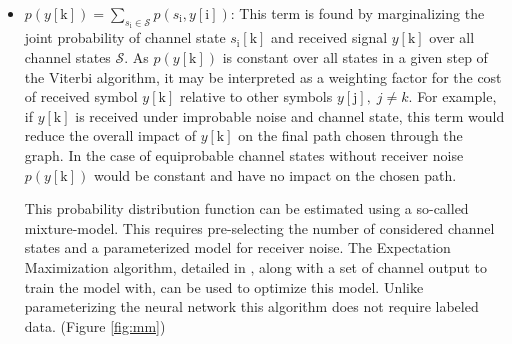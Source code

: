 \documentclass[12pt,a4paper]{report}
\begin{document}
\begin{itemize}
\item $p(y[\mathrm{k}]) = \sum_{s_{\mathrm{i}} \in \textit{$\mathcal{S}$}}p(s_{\mathrm{i}},y[\mathrm{i}])$: This term is found by marginalizing the joint probability of channel state $s_{\mathrm{i}}[\mathrm{k}]$ and received signal $y[\mathrm{k}]$ over all channel states $\mathcal{S}$. As $p(y[\mathrm{k}])$ is constant over all states in a given step of the Viterbi algorithm, it may be interpreted as a weighting factor for the cost of received symbol $y[\mathrm{k}]$ relative to other symbols $y[\mathrm{j}], \; j\neq k$. For example, if $y[\mathrm{k}]$ is received under improbable noise and channel state, this term would reduce the overall impact of $y[\mathrm{k}]$ on the final path chosen through the graph. In the case of equiprobable channel states without receiver noise $p(y[\mathrm{k}])$ would be constant and have no impact on the chosen path.
\par
This probability distribution function can be estimated using a so-called mixture-model. This requires pre-selecting the number of considered channel states and a parameterized model for receiver noise. The Expectation Maximization algorithm, detailed in \cite{ng2000cs229}, along with a set of channel output to train the model with, can be used to optimize this model. Unlike parameterizing the neural network this algorithm does not require labeled data. 
 (Figure \ref{fig:mm})
%
%



\end{itemize}
\end{document}
